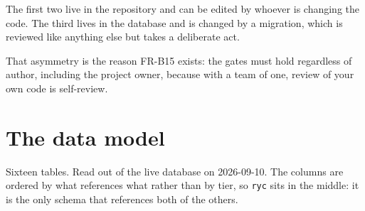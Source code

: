 \documentclass[11pt,a4paper]{article}
\begin{document}
\begin{careful}
The first two live in the repository and can be edited by whoever is changing
the code. The third lives in the database and is changed by a migration, which
is reviewed like anything else but takes a deliberate act.

That asymmetry is the reason FR-B15 exists: the gates must hold regardless of
author, including the project owner, because with a team of one, review of your
own code is self-review.
\end{careful}

\newpage
\section{The data model}

Sixteen tables. Read out of the live database on 2026-09-10. The columns are
ordered by what references what rather than by tier, so \texttt{ryc} sits in the
middle: it is the only schema that references both of the others.
\end{document}
